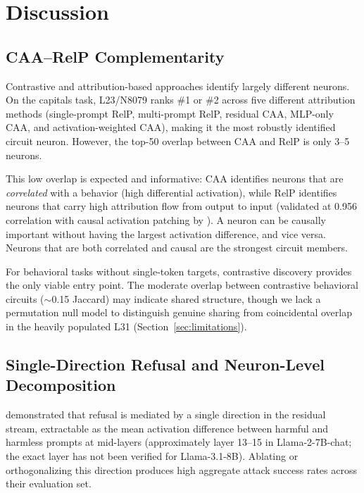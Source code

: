 \documentclass[11pt]{article}
\begin{document}
\section{Discussion}
\label{sec:discussion}

\subsection{CAA--RelP Complementarity}

Contrastive and attribution-based approaches identify largely different neurons.
On the capitals task, L23/N8079 ranks \#1 or \#2 across five different attribution methods (single-prompt RelP, multi-prompt RelP, residual CAA, MLP-only CAA, and activation-weighted CAA), making it the most robustly identified circuit neuron.
However, the top-50 overlap between CAA and RelP is only 3--5 neurons.

This low overlap is expected and informative: CAA identifies neurons that are \emph{correlated} with a behavior (high differential activation), while RelP identifies neurons that carry high attribution flow from output to input (validated at 0.956 correlation with causal activation patching by \citet{jafari2025relp}).
A neuron can be causally important without having the largest activation difference, and vice versa.
Neurons that are both correlated and causal are the strongest circuit members.

For behavioral tasks without single-token targets, contrastive discovery provides the only viable entry point.
The moderate overlap between contrastive behavioral circuits (${\sim}$0.15 Jaccard) may indicate shared structure, though we lack a permutation null model to distinguish genuine sharing from coincidental overlap in the heavily populated L31 (Section~\ref{sec:limitations}).

\subsection{Single-Direction Refusal and Neuron-Level Decomposition}

\citet{arditi2024refusal} demonstrated that refusal is mediated by a single direction in the residual stream, extractable as the mean activation difference between harmful and harmless prompts at mid-layers (approximately layer 13--15 in Llama-2-7B-chat; the exact layer has not been verified for Llama-3.1-8B).
Ablating or orthogonalizing this direction produces high aggregate attack success rates across their evaluation set.
\end{document}
